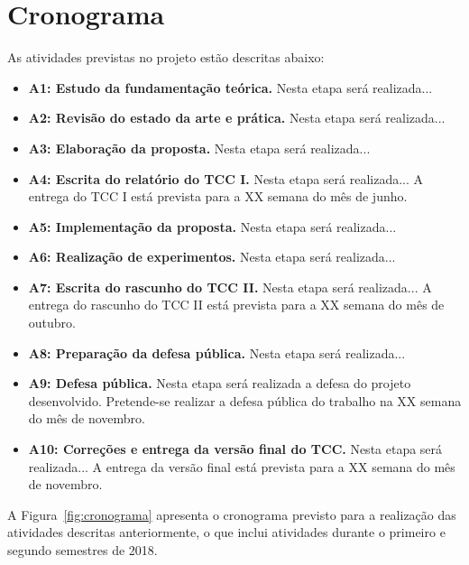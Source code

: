 \chapter{Cronograma}

As atividades previstas no projeto estão descritas abaixo:


\begin{itemize}
	\item \textbf{A1: Estudo da fundamentação teórica.} Nesta etapa será realizada...
	\item \textbf{A2: Revisão do estado da arte e prática.} Nesta etapa será realizada...
	\item \textbf{A3: Elaboração da proposta.} Nesta etapa será realizada...
	\item \textbf{A4: Escrita do relatório do TCC I.} Nesta etapa será realizada... A entrega do TCC I está prevista para a XX semana do mês de junho.
	\item \textbf{A5: Implementação da proposta.} Nesta etapa será realizada...
	\item \textbf{A6: Realização de experimentos.} Nesta etapa será realizada...
	\item \textbf{A7: Escrita do rascunho do TCC II.} Nesta etapa será realizada... A entrega do rascunho do TCC II está prevista para a XX semana do mês de outubro.
	\item \textbf{A8: Preparação da defesa pública.} Nesta etapa será realizada... 
	\item \textbf{A9: Defesa pública.} Nesta etapa será realizada a defesa do projeto desenvolvido. Pretende-se realizar a defesa pública do trabalho na XX semana do mês de novembro.
	\item \textbf{A10: Correções e entrega da versão final do TCC.} Nesta etapa será realizada... A entrega da versão final está prevista para a XX semana do mês de novembro.
\end{itemize}

A Figura~\ref{fig:cronograma} apresenta o cronograma previsto para a realização das atividades descritas anteriormente, o que inclui atividades durante o primeiro e segundo semestres de 2018.

